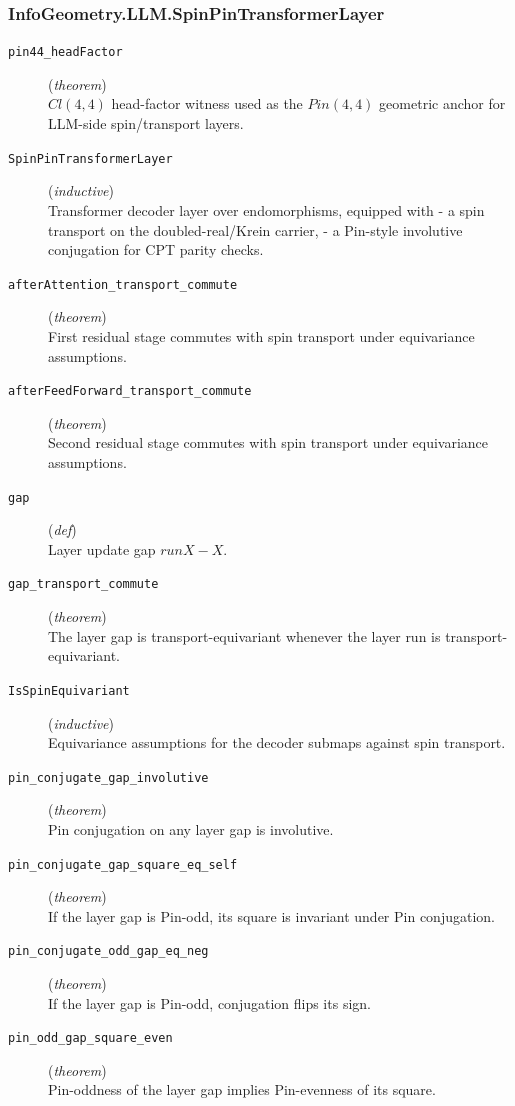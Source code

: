 \documentclass[11pt,a4paper]{article}
\begin{document}
\subsubsection*{InfoGeometry.LLM.SpinPinTransformerLayer}
\begin{description}
  \item[\texttt{pin44\_headFactor}] (\textit{theorem}) \\ $Cl(4,4)$ head-factor witness used as the $Pin(4,4)$ geometric anchor 
for LLM-side spin/transport layers.
  \item[\texttt{SpinPinTransformerLayer}] (\textit{inductive}) \\ Transformer decoder layer over endomorphisms, equipped with 
- a spin transport on the doubled-real/Krein carrier, 
- a Pin-style involutive conjugation for CPT parity checks.
  \item[\texttt{afterAttention\_transport\_commute}] (\textit{theorem}) \\ First residual stage commutes with spin transport under equivariance assumptions.
  \item[\texttt{afterFeedForward\_transport\_commute}] (\textit{theorem}) \\ Second residual stage commutes with spin transport under equivariance assumptions.
  \item[\texttt{gap}] (\textit{def}) \\ Layer update gap $run X - X$.
  \item[\texttt{gap\_transport\_commute}] (\textit{theorem}) \\ The layer gap is transport-equivariant whenever the layer run is transport-equivariant.
  \item[\texttt{IsSpinEquivariant}] (\textit{inductive}) \\ Equivariance assumptions for the decoder submaps against spin transport.
  \item[\texttt{pin\_conjugate\_gap\_involutive}] (\textit{theorem}) \\ Pin conjugation on any layer gap is involutive.
  \item[\texttt{pin\_conjugate\_gap\_square\_eq\_self}] (\textit{theorem}) \\ If the layer gap is Pin-odd, its square is invariant under Pin conjugation.
  \item[\texttt{pin\_conjugate\_odd\_gap\_eq\_neg}] (\textit{theorem}) \\ If the layer gap is Pin-odd, conjugation flips its sign.
  \item[\texttt{pin\_odd\_gap\_square\_even}] (\textit{theorem}) \\ Pin-oddness of the layer gap implies Pin-evenness of its square.

\end{description}
\end{document}
